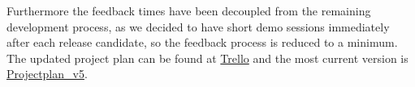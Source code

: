 \documentclass[11pt,twocolumn]{article}
\begin{document}
Furthermore the feedback times have been decoupled from the remaining development process, as we decided to have short demo sessions immediately after each release candidate, so the feedback process is reduced to a minimum. The updated project plan can be found at \href{https://trello.com/c/ZQKwDSvG}{Trello} and the most current version is \href{https://trello-attachments.s3.amazonaws.com/56c4a277153128da8ebc828c/2215x1098/9ad8a2d9dd43f6fe0c54597f0a8b7a4f/Projectplan_v5.png}{Projectplan\_v5}.







 
\end{document}
